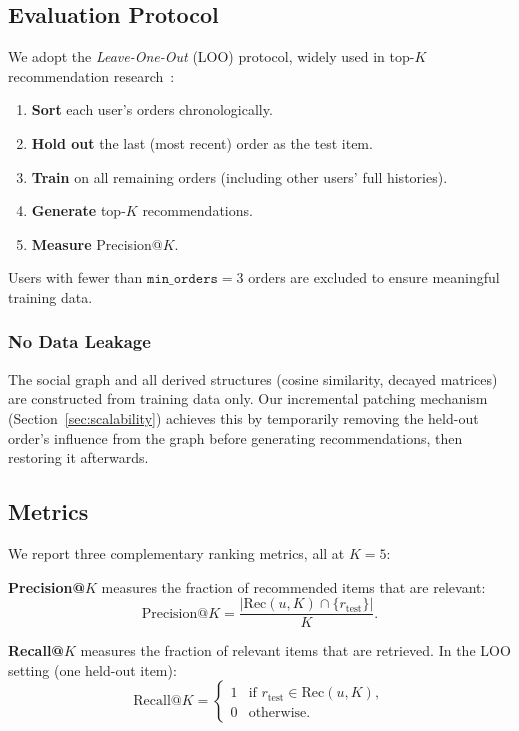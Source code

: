 \documentclass[conference]{IEEEtran}
\begin{document}
\subsection{Evaluation Protocol}
We adopt the \emph{Leave-One-Out} (LOO) protocol, widely used in top-$K$
recommendation research~\cite{he2017neural}:
\begin{enumerate}
  \item \textbf{Sort} each user's orders chronologically.
  \item \textbf{Hold out} the last (most recent) order as the test item.
  \item \textbf{Train} on all remaining orders (including other users'
        full histories).
  \item \textbf{Generate} top-$K$ recommendations.
  \item \textbf{Measure} Precision@$K$.
\end{enumerate}

Users with fewer than $\texttt{min\_orders} = 3$ orders are excluded to
ensure meaningful training data.

\subsubsection{No Data Leakage}
The social graph and all derived structures (cosine similarity, decayed
matrices) are constructed from training data only.  Our incremental
patching mechanism (Section~\ref{sec:scalability}) achieves this by
temporarily removing the held-out order's influence from the graph before
generating recommendations, then restoring it afterwards.

\subsection{Metrics}
We report three complementary ranking metrics, all at $K = 5$:

\textbf{Precision@$K$} measures the fraction of recommended items that
are relevant:
\begin{equation}
  \text{Precision@}K = \frac{|\text{Rec}(u, K) \cap
    \{r_{\text{test}}\}|}{K}.
  \label{eq:precision}
\end{equation}

\textbf{Recall@$K$} measures the fraction of relevant items that are
retrieved.  In the LOO setting (one held-out item):
\begin{equation}
  \text{Recall@}K =
    \begin{cases}
      1 & \text{if } r_{\text{test}} \in \text{Rec}(u, K), \\
      0 & \text{otherwise}.
    \end{cases}
  \label{eq:recall}
\end{equation}
\end{document}
